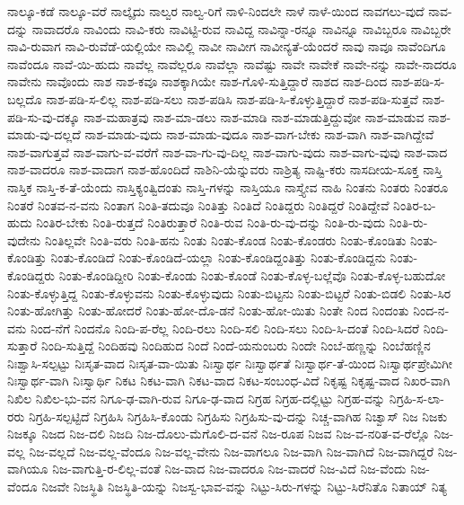 {ನಾಲ್ಕೂ-ಕಡೆ
ನಾಲ್ಕೂ-ವರೆ
ನಾಲ್ಕೈದು
ನಾಲ್ವರ
ನಾಲ್ವ-ರಿಗೆ
ನಾಳಿ-ನಿಂದಲೇ
ನಾಳೆ
ನಾಳೆ-ಯಿಂದ
ನಾವಗಲು-ವುದೆ
ನಾವ-ದನ್ನು
ನಾವಾದರೊ
ನಾವಿಂದು
ನಾವಿ-ಕರು
ನಾವಿಟ್ಟಿ-ರುವ
ನಾವಿದ್ದ
ನಾವಿನ್ನಾ-ರನ್ನೂ
ನಾವಿನ್ನೂ
ನಾವಿಬ್ಬರೂ
ನಾವಿಬ್ಬರೇ
ನಾವಿ-ರುವಾಗ
ನಾವಿ-ರುವೆಡೆ-ಯಲ್ಲಿಯೇ
ನಾವಿಲ್ಲಿ
ನಾವೀ
ನಾವೀಗ
ನಾವೀನ್ಯತೆ-ಯೆಂದರೆ
ನಾವು
ನಾವೂ
ನಾವೆಂದಿಗೂ
ನಾವೆಂದೂ
ನಾವೆ-ಯಿ-ಹುದು
ನಾವೆಲ್ಲ
ನಾವೆಲ್ಲರೂ
ನಾವೆಲ್ಲಾ
ನಾವೆಷ್ಟು
ನಾವೇ
ನಾವೇಕೆ
ನಾವೇ-ನನ್ನು
ನಾವೇ-ನಾದರೂ
ನಾವೇನು
ನಾವೊಂದು
ನಾಶ
ನಾಶ-ಕವೂ
ನಾಶಕ್ಕಾಗಿಯೇ
ನಾಶ-ಗೊಳಿ-ಸುತ್ತಿದ್ದಾರೆ
ನಾಶದ
ನಾಶ-ದಿಂದ
ನಾಶ-ಪಡಿ-ಸ-ಬಲ್ಲದೊ
ನಾಶ-ಪಡಿ-ಸ-ಲಿಲ್ಲ
ನಾಶ-ಪಡಿ-ಸಲು
ನಾಶ-ಪಡಿಸಿ
ನಾಶ-ಪಡಿ-ಸಿ-ಕೊಳ್ಳುತ್ತಿದ್ದಾರೆ
ನಾಶ-ಪಡಿ-ಸುತ್ತವೆ
ನಾಶ-ಪಡಿ-ಸು-ವು-ದಕ್ಕೂ
ನಾಶ-ಮಹಾತ್ರವು
ನಾಶ-ಮಾ-ಡಲು
ನಾಶ-ಮಾಡಿ
ನಾಶ-ಮಾಡುತ್ತಿದ್ದುವೋ
ನಾಶ-ಮಾಡುವ
ನಾಶ-ಮಾಡು-ವು-ದಲ್ಲದೆ
ನಾಶ-ಮಾಡು-ವುದು
ನಾಶ-ಮಾಡು-ವುದೂ
ನಾಶ-ವಾಗ-ಬೇಕು
ನಾಶ-ವಾಗಿ
ನಾಶ-ವಾಗಿದ್ದೇವೆ
ನಾಶ-ವಾಗುತ್ತವೆ
ನಾಶ-ವಾಗು-ವ-ವರೆಗೆ
ನಾಶ-ವಾ-ಗು-ವು-ದಿಲ್ಲ
ನಾಶ-ವಾಗು-ವುದು
ನಾಶ-ವಾಗು-ವುವು
ನಾಶ-ವಾದ
ನಾಶ-ವಾದರೂ
ನಾಶ-ವಾದಾಗ
ನಾಶ-ಹೊಂದಿದೆ
ನಾಶಿನಿ-ಯೆನ್ನುವರು
ನಾಶ್ರಿತ್ಯ
ನಾಷ್ಟಿ-ಕರು
ನಾಸದೀಯ-ಸೂಕ್ತ
ನಾಸ್ತಿ
ನಾಸ್ತಿಕ
ನಾಸ್ತಿ-ಕ-ತೆ-ಯೆಂದು
ನಾಸ್ತಿಕ್ಯಂತ್ವಿದಂತು
ನಾಸ್ತಿ-ಗಳನ್ನು
ನಾಸ್ತಿಯೂ
ನಾಸ್ತ್ಯೇವ
ನಾಹಿ
ನಿಂತನು
ನಿಂತರು
ನಿಂತರೂ
ನಿಂತರೆ
ನಿಂತವ-ನ-ವನು
ನಿಂತಾಗ
ನಿಂತಿ-ತದುವೂ
ನಿಂತಿತ್ತು
ನಿಂತಿದೆ
ನಿಂತಿದ್ದರು
ನಿಂತಿದ್ದರೆ
ನಿಂತಿದ್ದೇವೆ
ನಿಂತಿರ-ಬ-ಹುದು
ನಿಂತಿರ-ಬೇಕು
ನಿಂತಿ-ರುತ್ತದೆ
ನಿಂತಿರುತ್ತಾರೆ
ನಿಂತಿ-ರುವ
ನಿಂತಿ-ರು-ವು-ದನ್ನು
ನಿಂತಿ-ರು-ವುದು
ನಿಂತಿ-ರು-ವುದೇನು
ನಿಂತಿಲ್ಲವೇ
ನಿಂತಿ-ವರು
ನಿಂತಿ-ಹನು
ನಿಂತು
ನಿಂತು-ಕೊಂಡ
ನಿಂತು-ಕೊಂಡರು
ನಿಂತು-ಕೊಂಡಿತು
ನಿಂತು-ಕೊಂಡಿತ್ತು
ನಿಂತು-ಕೊಂಡಿದೆ
ನಿಂತು-ಕೊಂಡಿದೆ-ಯಲ್ಲಾ
ನಿಂತು-ಕೊಂಡಿದ್ದಂತಿತ್ತು
ನಿಂತು-ಕೊಂಡಿದ್ದನು
ನಿಂತು-ಕೊಂಡಿದ್ದರು
ನಿಂತು-ಕೊಂಡಿದ್ದೀರಿ
ನಿಂತು-ಕೊಂಡು
ನಿಂತು-ಕೊಂಡೆ
ನಿಂತು-ಕೊಳ್ಳ-ಬಲ್ಲೆವೊ
ನಿಂತು-ಕೊಳ್ಳ-ಬಹುದೋ
ನಿಂತು-ಕೊಳ್ಳುತ್ತಿದ್ದ
ನಿಂತು-ಕೊಳ್ಳುವನು
ನಿಂತು-ಕೊಳ್ಳುವುದು
ನಿಂತು-ಬಿಟ್ಟನು
ನಿಂತು-ಬಿಟ್ಟರೆ
ನಿಂತು-ಬಿಡಲಿ
ನಿಂತು-ಸಿರ
ನಿಂತು-ಹೋಗಿತ್ತು
ನಿಂತು-ಹೋದರೆ
ನಿಂತು-ಹೋ-ದೊ-ಡನೆ
ನಿಂತು-ಹೋ-ಯಿತು
ನಿಂತೇ
ನಿಂದ
ನಿಂದಂತು
ನಿಂದ-ನ-ವನು
ನಿಂದ-ನೆಗೆ
ನಿಂದನೊ
ನಿಂದಿ-ಪ-ರೆಲ್ಲ
ನಿಂದಿ-ರಲು
ನಿಂದಿ-ಸಲಿ
ನಿಂದಿ-ಸಲು
ನಿಂದಿ-ಸಿ-ದಂತೆ
ನಿಂದಿ-ಸಿದರೆ
ನಿಂದಿ-ಸುತ್ತಾರೆ
ನಿಂದಿ-ಸುತ್ತಿದ್ದೆ
ನಿಂದಿಹವು
ನಿಂದಿಹುದ
ನಿಂದೆ
ನಿಂದೆ-ಯನುಂಬರು
ನಿಂದೇ
ನಿಂಬೆ-ಹಣ್ಣನ್ನು
ನಿಂಬೆಹಣ್ಣಿನ
ನಿಃಶ್ವಾಸಿ-ಸಲ್ಪಟ್ಟು
ನಿಃಸೃತ-ವಾದ
ನಿಃಸೃತ-ವಾ-ಯಿತು
ನಿಃಸ್ವಾರ್ಥ
ನಿಃಸ್ವಾರ್ಥತೆ
ನಿಃಸ್ವಾರ್ಥ-ತೆ-ಯಿಂದ
ನಿಃಸ್ವಾರ್ಥಪ್ರೇಮಿಗೀ
ನಿಃಸ್ವಾರ್ಥ-ವಾಗಿ
ನಿಃಸ್ವಾರ್ಥಿ
ನಿಕಟ
ನಿಕಟ-ವಾಗಿ
ನಿಕಟ-ವಾದ
ನಿಕಟ-ಸಂಬಂಧ-ವಿದೆ
ನಿಕೃಷ್ಟ
ನಿಕೃಷ್ಟ-ವಾದ
ನಿಖರ-ವಾಗಿ
ನಿಖಿಲ
ನಿಖಿಲ-ಭು-ವನ
ನಿಗೂ-ಢ-ವಾಗಿ-ರುವ
ನಿಗೂ-ಢ-ವಾದ
ನಿಗ್ರಹ
ನಿಗ್ರಹ-ದಲ್ಲಿಟ್ಟು
ನಿಗ್ರಹ-ವನ್ನು
ನಿಗ್ರಹಿ-ಸ-ಲಾ-ರರು
ನಿಗ್ರಹಿ-ಸಲ್ಪಟ್ಟಿದೆ
ನಿಗ್ರಹಿಸಿ
ನಿಗ್ರಹಿಸಿ-ಕೊಂಡು
ನಿಗ್ರಹಿಸು
ನಿಗ್ರಹಿಸು-ವು-ದನ್ನು
ನಿಚ್ಚ-ವಾಗಿಹ
ನಿಚ್ವಾಸ್
ನಿಜ
ನಿಜಕು
ನಿಜಕ್ಕೂ
ನಿಜದ
ನಿಜ-ದಲಿ
ನಿಜದಿ
ನಿಜ-ದೊಲು-ಮೆಗೊಲಿ-ದ-ವನೆ
ನಿಜ-ರೂಪ
ನಿಜವ
ನಿಜ-ವ-ನರಿತ-ವ-ರೆಲ್ಲೊ
ನಿಜ-ವಲ್ಲ
ನಿಜ-ವಲ್ಲದೆ
ನಿಜ-ವಲ್ಲ-ವೆಂದೂ
ನಿಜ-ವಲ್ಲ-ವೇನು
ನಿಜ-ವಾಗಲೂ
ನಿಜ-ವಾಗಿ
ನಿಜ-ವಾಗಿದೆ
ನಿಜ-ವಾಗಿದ್ದರೆ
ನಿಜ-ವಾಗಿಯೂ
ನಿಜ-ವಾಗುತ್ತಿ-ರ-ಲಿಲ್ಲ-ವಂತೆ
ನಿಜ-ವಾದ
ನಿಜ-ವಾದರೂ
ನಿಜ-ವಾದರೆ
ನಿಜ-ವಿದೆ
ನಿಜ-ವೆಂದು
ನಿಜ-ವೆಂದೂ
ನಿಜವೇ
ನಿಜಸ್ಥಿತಿ
ನಿಜಸ್ಥಿತಿ-ಯನ್ನು
ನಿಜಸ್ವ-ಭಾವ-ವನ್ನು
ನಿಟ್ಟು-ಸಿರು-ಗಳನ್ನು
ನಿಟ್ಟು-ಸಿರೆನಿತೊ
ನಿತಾಯ್
ನಿತ್ಯ
}
